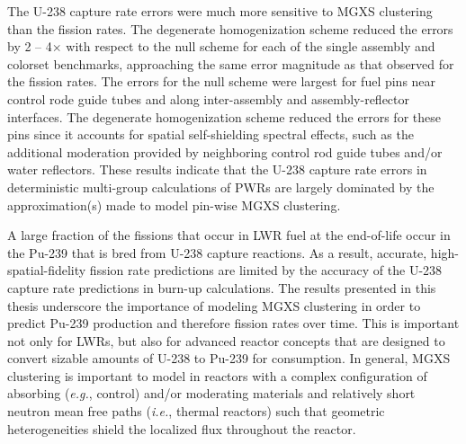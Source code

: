 The U-238 capture rate errors were much more sensitive to \ac{MGXS} clustering than the fission rates. The degenerate homogenization scheme reduced the errors by 2 -- 4$\times$ with respect to the null scheme for each of the single assembly and colorset benchmarks, approaching the same error magnitude as that observed for the fission rates. The errors for the null scheme were largest for fuel pins near control rode guide tubes and along inter-assembly and assembly-reflector interfaces. The degenerate homogenization scheme reduced the errors for these pins since it accounts for spatial self-shielding spectral effects, such as the additional moderation provided by neighboring control rod guide tubes and/or water reflectors. These results indicate that the U-238 capture rate errors in deterministic multi-group calculations of \acp{PWR} are largely dominated by the approximation(s) made to model pin-wise \ac{MGXS} clustering.

A large fraction of the fissions that occur in \ac{LWR} fuel at the end-of-life occur in the Pu-239 that is bred from U-238 capture reactions. As a result, accurate, high-spatial-fidelity fission rate predictions are limited by the accuracy of the U-238 capture rate predictions in burn-up calculations. The results presented in this thesis underscore the importance of modeling \ac{MGXS} clustering in order to predict Pu-239 production and therefore fission rates over time. This is important not only for \acp{LWR}, but also for advanced reactor concepts that are designed to convert sizable amounts of U-238 to Pu-239 for consumption. In general, \ac{MGXS} clustering is important to model in reactors with a complex configuration of absorbing (\textit{e.g.}, control) and/or moderating materials and relatively short neutron mean free paths (\textit{i.e.}, thermal reactors) such that geometric heterogeneities shield the localized flux throughout the reactor.




